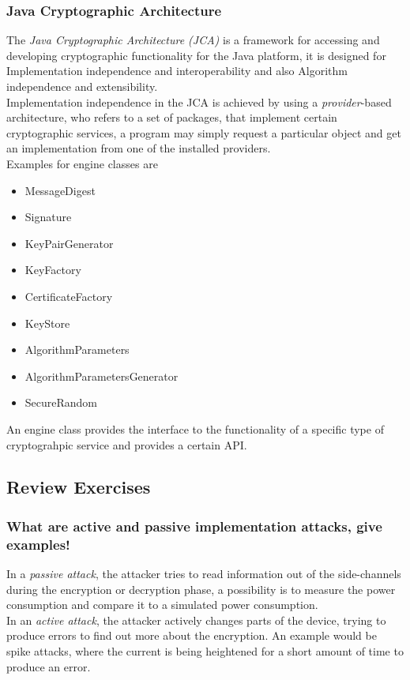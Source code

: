 \documentclass[a4paper, 10 pt, conference]{ieeeconf}
\begin{document}
\vspace{0.5cm}
\subsubsection{\textbf{Java Cryptographic Architecture}}
\label{jca}
The \emph{Java Cryptographic Architecture (JCA)} is a framework for accessing and developing cryptographic functionality for the Java platform, it is designed for Implementation independence and interoperability and also Algorithm independence and extensibility. \\
Implementation independence in the JCA is achieved by using a \emph{provider}-based architecture, who refers to a set of packages, that implement certain cryptographic services, a program may simply request a particular object and get an implementation from one of the installed providers. \\
Examples for engine classes are
\begin{itemize}
\item MessageDigest
\item Signature
\item KeyPairGenerator
\item KeyFactory
\item CertificateFactory
\item KeyStore
\item AlgorithmParameters
\item AlgorithmParametersGenerator
\item SecureRandom
\end{itemize}
An engine class provides the interface to the functionality of a specific type of cryptograhpic service and provides a certain API. 


\subsection{\textbf{Review Exercises}}
\subsubsection{\textbf{What are active and passive implementation attacks, give examples!}}
In a \emph{passive attack}, the attacker tries to read information out of the side-channels during the encryption or decryption phase, a possibility is to measure the power consumption and compare it to a simulated power consumption.\\
In an \emph{active attack}, the attacker actively changes parts of the device, trying to produce errors to find out more about the encryption. An example would be spike attacks, where the current is being heightened for a short amount of time to produce an error. 
\end{document}
